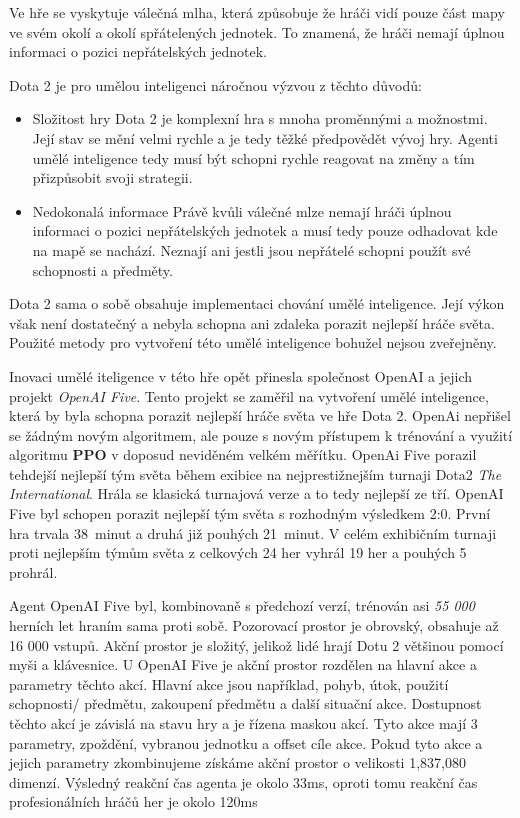 Ve hře se vyskytuje válečná mlha, která způsobuje že hráči vidí pouze část mapy ve svém okolí a okolí spřátelených jednotek.
To znamená, že hráči nemají úplnou informaci o pozici nepřátelských jednotek.

\bigskip

Dota 2 je pro umělou inteligenci náročnou výzvou z těchto důvodů:
\begin{itemize}
  \item Složitost hry
  Dota 2 je komplexní hra s mnoha proměnnými a možnostmi.
  Její stav se mění velmi rychle a je tedy těžké předpovědět vývoj hry.
  Agenti umělé inteligence tedy musí být schopni rychle reagovat na změny a tím přizpůsobit svoji strategii.
  \item Nedokonalá informace
  Právě kvůli válečné mlze nemají hráči úplnou informaci o pozici nepřátelských jednotek a musí tedy pouze odhadovat kde na mapě se nachází.
  Neznají ani jestli jsou nepřátelé schopni použít své schopnosti a předměty.
\end{itemize}

Dota 2 sama o sobě obsahuje implementaci chování umělé inteligence.
Její výkon však není dostatečný a nebyla schopna ani zdaleka porazit nejlepší hráče světa.
Použité metody pro vytvoření této umělé inteligence bohužel nejsou zveřejněny.

Inovaci umělé iteligence v této hře opět přinesla společnost OpenAI a jejich projekt \emph{OpenAI Five}\cite{Dota2}.
Tento projekt se zaměřil na vytvoření umělé inteligence, která by byla schopna porazit nejlepší hráče světa ve hře Dota 2.
OpenAi nepřišel se žádným novým algoritmem, ale pouze s novým přístupem k trénování a využití algoritmu \textbf{PPO} v doposud neviděném velkém měřítku. 
OpenAi Five porazil tehdejší nejlepší tým světa během exibice na nejprestižnejším turnaji Dota2 \textit{The International}.
Hrála se klasická turnajová verze a to tedy nejlepší ze tří.
OpenAI Five byl schopen porazit nejlepší tým světa s rozhodným výsledkem 2:0.
První hra trvala 38~minut a druhá již pouhých 21~minut.
V celém exhibičním turnaji proti nejlepším týmům světa z celkových 24 her vyhrál 19 her a pouhých 5 prohrál.

Agent OpenAI Five byl, kombinovaně s předchozí verzí, trénován asi \emph{55 000} herních let hraním sama proti sobě.
Pozorovací prostor je obrovský, obsahuje až 16 000 vstupů.
Akční prostor je složitý, jelikož lidé hrají Dotu 2 většinou pomocí myši a klávesnice.
U OpenAI Five je akční prostor rozdělen na hlavní akce a parametry těchto akcí.
Hlavní akce jsou například, pohyb, útok, použití schopnosti/ předmětu, zakoupení předmětu a další situační akce.
Dostupnost těchto akcí je závislá na stavu hry a je řízena maskou akcí.
Tyto akce mají 3 parametry, zpoždění, vybranou jednotku a offset cíle akce.
Pokud tyto akce a jejich parametry zkombinujeme získáme akční prostor o velikosti 1,837,080 dimenzí.
Výsledný reakční čas agenta je okolo 33ms, oproti tomu reakční čas profesionálních hráčů her je okolo 120ms\cite{reaction_time}

